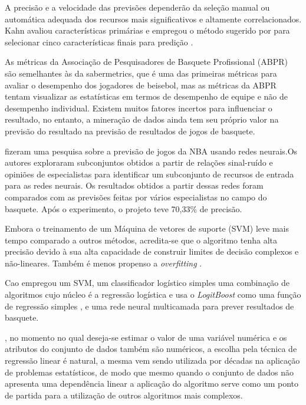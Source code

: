 A precisão e a velocidade das previsões dependerão da seleção manual ou automática adequada dos recursos mais significativos e altamente correlacionados. Kahn avaliou características primárias e empregou o método sugerido por \cite{Purucker1996} para selecionar cinco características finais para predição \cite{Kahn2003}.

As métricas da Associação de Pesquisadores de Basquete Profissional (ABPR) são semelhantes às da sabermetrics, que é uma das primeiras métricas para avaliar o desempenho dos jogadores de beisebol, mas as métricas da ABPR tentam visualizar as estatísticas em termos de desempenho de equipe e não de desempenho individual. Existem muitos fatores incertos para influenciar o resultado, no entanto, a mineração de dados ainda tem seu próprio valor na previsão do resultado na previsão de resultados de jogos de basquete.\cite{Schumaker2010}

 fizeram uma pesquisa sobre a previsão de jogos da NBA usando redes neurais.Os autores exploraram subconjuntos obtidos a partir de relações sinal-ruído e opiniões de especialistas para identificar um subconjunto de recursos de entrada para as redes neurais. Os resultados obtidos a partir dessas redes foram comparados com as previsões feitas por vários especialistas no campo do basquete. Após o experimento, o projeto teve 70,33\% de precisão.

Embora o treinamento de um Máquina de vetores de suporte (SVM) leve mais tempo comparado a outros métodos, acredita-se que o algoritmo tenha alta precisão devido à sua alta capacidade de construir limites de decisão complexos e não-lineares. Também é menos propenso a \textit{overfitting} \cite{Han2017}. 

Cao empregou um SVM, um classificador logístico simples uma combinação de algoritmos cujo núcleo é a regressão logística e usa o \textit{LogitBoost} como uma função de regressão simples \cite{Landwehr2005}, e uma rede neural multicamada para prever resultados de basquete.

, no momento no qual deseja-se estimar o valor de uma variável numérica e os atributos do  conjunto de dados também são numéricos, a escolha pela técnica de regressão linear é natural, a mesma vem sendo utilizada por décadas na aplicação de problemas estatísticos, de modo que mesmo quando o conjunto de dados não apresenta uma dependência linear a aplicação do algoritmo serve como um ponto de partida para a utilização de outros algoritmos mais complexos.

